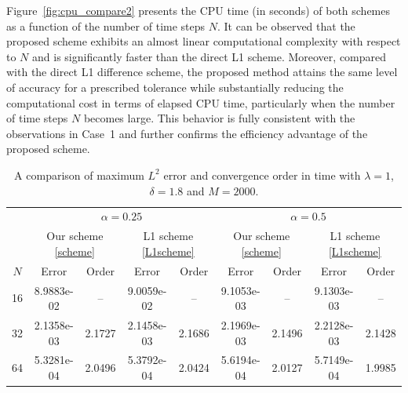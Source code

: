 \documentclass[10pt, reqno]{amsart}
\theoremstyle{remark}
\theoremstyle{definition}
\numberwithin{table}{section}
\begin{document}
Figure~\ref{fig:cpu_compare2} presents the CPU time (in seconds) of both schemes as a function of the number of time steps $N$. It can be observed that the proposed scheme exhibits an almost linear computational complexity with respect to $N$ and is significantly faster than the direct L1 scheme. Moreover, compared with the direct L1 difference scheme, the proposed method attains the same level of accuracy for a prescribed tolerance while substantially reducing the computational cost in terms of elapsed CPU time, particularly when the number of time steps $N$ becomes large. This behavior is fully consistent with the observations in Case~1 and further confirms the efficiency advantage of the proposed scheme.

\begin{table}[htbp]
\centering
\setlength{\tabcolsep}{5pt}   %
\caption{A comparison of maximum $L^2$ error and convergence order in time with $\lambda=1$, $\delta=1.8$ and $M=2000$.}
\label{table:errors2t}
\begin{tabular}{c c c c c c c c c}
\toprule
& \multicolumn{4}{c}{$\alpha=0.25$} 
& \multicolumn{4}{c}{$\alpha=0.5$} \\
\cmidrule(lr){2-5} \cmidrule(lr){6-9}
 & \multicolumn{2}{c}{Our scheme \eqref{scheme}} & \multicolumn{2}{c}{L1 scheme \eqref{L1scheme}}   & \multicolumn{2}{c}{Our scheme \eqref{scheme}} & \multicolumn{2}{c}{L1 scheme \eqref{L1scheme}} \\
\cmidrule(lr){2-3} \cmidrule(lr){4-5} \cmidrule(lr){6-7} \cmidrule(lr){8-9}
\multirow{1}{*}{$N$} & Error & Order & Error & Order & Error & Order & Error & Order \\
\midrule
16
& 8.9883e-02 &  --  & 9.0059e-02 & --   & 9.1053e-03 & --   & 9.1303e-03 & -- \\
32
& 2.1358e-03 & 2.1727  & 2.1458e-03 & 2.1686   & 2.1969e-03 & 2.1496   & 2.2128e-03 & 2.1428 \\
64
& 5.3281e-04 & 2.0496   & 5.3792e-04 & 2.0424   & 5.6194e-04 & 2.0127   & 5.7149e-04 & 1.9985 \\
\bottomrule
\end{tabular}
\end{table}
\end{document}
